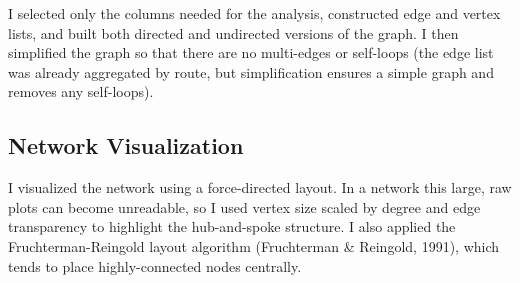 \documentclass[
  letterpaper,
]{report}
\begin{document}
I selected only the columns needed for the analysis, constructed edge
and vertex lists, and built both directed and undirected versions of the
graph. I then simplified the graph so that there are no multi-edges or
self-loops (the edge list was already aggregated by route, but
simplification ensures a simple graph and removes any self-loops).

\subsection{Network Visualization}\label{network-visualization}

I visualized the network using a force-directed layout. In a network
this large, raw plots can become unreadable, so I used vertex size
scaled by degree and edge transparency to highlight the hub-and-spoke
structure. I also applied the Fruchterman-Reingold layout algorithm
(Fruchterman \& Reingold, 1991), which tends to place highly-connected
nodes centrally.
\end{document}
